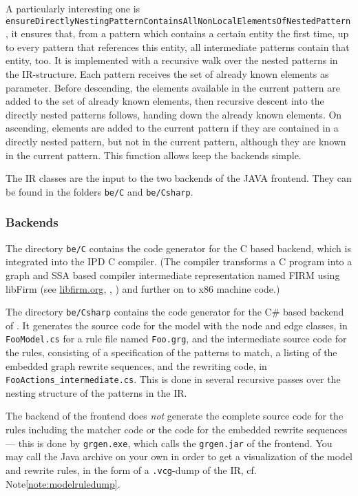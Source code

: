 A particularly interesting one is \texttt{ensure\-Directly\-Nesting\-Pattern\-Contains\-All\-Non\-Local\-Elements\-Of\-Nested\-Pattern}, it ensures that, from a pattern which contains a certain entity the first time, up to every pattern that references this entity, all intermediate patterns contain that entity, too.
It is implemented with a recursive walk over the nested patterns in the IR-structure. 
Each pattern receives the set of already known elements as parameter.
Before descending, the elements available in the current pattern are added to the set of already known elements,
then recursive descent into the directly nested patterns follows, handing down the already known elements.
On ascending, elements are added to the current pattern if they are contained in a directly nested pattern, but not in the current pattern, although they are known in the current pattern.
This function allows keep the backends simple.

The IR classes are the input to the two backends of the JAVA frontend.
They can be found in the folders \texttt{be/C} and \texttt{be/Csharp}.


\subsubsection*{Backends}

The directory \texttt{be/C} contains the code generator for the C based backend, which is integrated into the IPD C compiler.
(The compiler transforms a C program into a graph and SSA based compiler intermediate representation named FIRM using libFirm (see \url{libfirm.org}, \cite{TBL:99}, \cite{Lin:02}) and further on to x86 machine code.)

The directory \texttt{be/Csharp} contains the code generator for the C\# based backend of \GrG. 
It generates the source code for the model with the node and edge classes, in \texttt{FooModel.cs} for a rule file named \texttt{Foo.grg},
and the intermediate source code for the rules, consisting of a specification of the patterns to match, a listing of the embedded graph rewrite sequences, and the rewriting code, in \texttt{Foo\-Actions\_intermediate.cs}.
This is done in several recursive passes over the nesting structure of the patterns in the IR. 

The backend of the frontend does \emph{not} generate the complete source code for the rules including the matcher code or the code for the embedded rewrite sequences --- this is done by \texttt{grgen.exe}, which calls the \texttt{grgen.jar} of the frontend.
You may call the Java archive on your own in order to get a visualization of the model and rewrite rules, in the form of a \texttt{.vcg}-dump of the IR, cf. Note\ref{note:modelruledump}.


